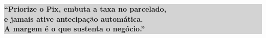 \documentclass[12pt, a4paper]{article}
\begin{document}
\begin{center}
\colorbox{lightGray}{%
    \parbox{0.85\textwidth}{%
        \centering
        \vspace{0.3cm}
        \textcolor{primaryColor}{\textbf{``Priorize o Pix, embuta a taxa no parcelado,}}\\
        \textcolor{primaryColor}{\textbf{e jamais ative antecipação automática.}}\\
        \textcolor{primaryColor}{\textbf{A margem é o que sustenta o negócio.''}}\\
        \vspace{0.3cm}
    }%
}
\end{center}

\pagebreak

\thispagestyle{empty}
\vspace*{0.5cm}
\end{document}
